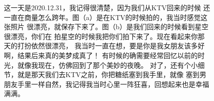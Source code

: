 \documentclass[cn,11pt,chinese]{elegantbook}
\begin{document}
\begin{figure}[htb]
	\caption{这一天是2020.12.31，我记得很清楚，因为我们从KTV回来的时候
	还一直在商量怎么跨年。图（a）是在KTV的时候拍的，我当时感觉这张照片
	很漂亮，就保存下来了。图（b）是我们回来的时候看到星空很漂亮，你们在
	拍星空的时候我把你们拍下来了。现在看起来你那天的打扮依然很漂亮，
	我当时一直在想，要是你是我女朋友该多好啊，结果后来真的美梦成真了！
	有时候的确需要经常回忆以前的时光，就像我现在，仿佛回到了那个美妙的夜晚。
	对了，还有个小细节，就是那天我们去KTV之前，你把糖纸塞到我手里，就像
	塞到男朋友手里一样自然，我记得我当时心里一阵狂喜，回想起来也是幸福满满。}
\end{figure}
\end{document}
